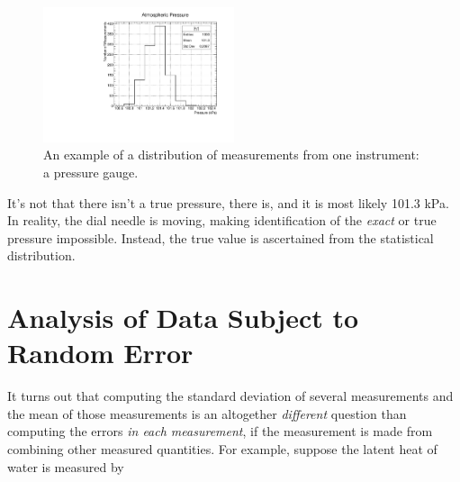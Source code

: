 \documentclass[12pt]{article}
\begin{document}
\begin{figure}
\centering
\includegraphics[width=0.5\textwidth]{histo.pdf}
\caption{\label{fig:histo} An example of a distribution of measurements from one instrument: a pressure gauge.}
\end{figure}

It's not that there isn't a true pressure, there is, and it is most likely 101.3 kPa.  In reality, the dial needle is moving, making identification of the \textit{exact} or true pressure impossible.  Instead, the true value is ascertained from the statistical distribution.

\section{Analysis of Data Subject to Random Error}

It turns out that computing the standard deviation of several measurements and the mean of those measurements is an altogether \textit{different} question than computing the errors \textit{in each measurement}, if the measurement is made from combining other measured quantities.  For example, suppose the latent heat of water is measured by 
\end{document}
